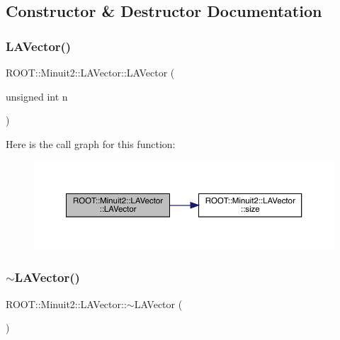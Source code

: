\subsection{Constructor \& Destructor Documentation}
\mbox{\label{classROOT_1_1Minuit2_1_1LAVector_a3dca313e27f716415056d248bd05cf1f}} 
\subsubsection{\texorpdfstring{LAVector()}{LAVector()}\hspace{0.1cm}{\footnotesize\ttfamily [1/24]}}
{\footnotesize\ttfamily R\+O\+O\+T\+::\+Minuit2\+::\+L\+A\+Vector\+::\+L\+A\+Vector (\begin{DoxyParamCaption}\item[{unsigned int}]{n }\end{DoxyParamCaption})\hspace{0.3cm}{\ttfamily [inline]}}

Here is the call graph for this function\+:
\nopagebreak
\begin{figure}[H]
\begin{center}
\leavevmode
\includegraphics[width=350pt]{d3/d20/classROOT_1_1Minuit2_1_1LAVector_a3dca313e27f716415056d248bd05cf1f_cgraph}
\end{center}
\end{figure}
\mbox{\label{classROOT_1_1Minuit2_1_1LAVector_a72c44338e1a37837e9546bfd674c22cb}} 
\subsubsection{\texorpdfstring{$\sim$LAVector()}{~LAVector()}\hspace{0.1cm}{\footnotesize\ttfamily [1/3]}}
{\footnotesize\ttfamily R\+O\+O\+T\+::\+Minuit2\+::\+L\+A\+Vector\+::$\sim$\+L\+A\+Vector (\begin{DoxyParamCaption}{ }\end{DoxyParamCaption})\hspace{0.3cm}{\ttfamily [inline]}}

